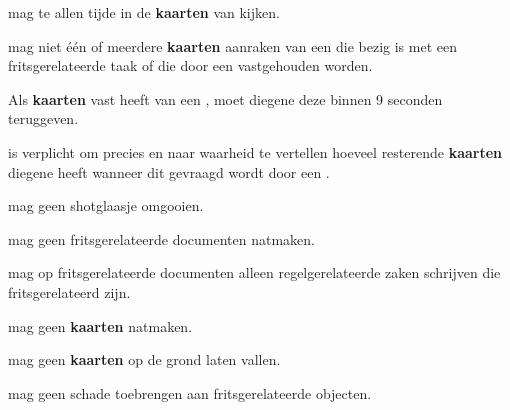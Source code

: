 
\vervolgLijst{}
\item \EenSpeler mag te allen tijde in de \textbf{kaarten} van \alleSpelers kijken.
\eindLijst{}

\vervolgLijst{}
\item \EenSpeler mag niet \'e\'en of meerdere \textbf{kaarten} aanraken van een \medeSpeler die bezig is met een fritsgerelateerde taak of die door een \medeSpeler vastgehouden worden.
\eindLijst{}

\vervolgLijst{}
\item Als \eenSpeler \textbf{kaarten} vast heeft van een \medeSpelerN, moet diegene deze binnen 9 seconden teruggeven.
\eindLijst{}

\vervolgLijst{}
\item \EenSpeler is verplicht om precies en naar waarheid te vertellen hoeveel resterende \textbf{kaarten} diegene heeft wanneer dit gevraagd wordt door een \medeSpelerN.
\eindLijst{}

\footnotetext[2]{\footnoteEenDubbeleFritsNemen}
\footnotetext[3]{\footnoteFritsjeDesNemen}

\newpage
{}
\label{hoofdstuk:algemeen_einde}



\vervolgLijst{}
\item \EenSpeler mag geen shotglaasje omgooien.
\eindLijst{}

\vervolgLijst{}
\item \EenSpeler mag geen fritsgerelateerde documenten natmaken.
\eindLijst{}

\vervolgLijst{}
\item \EenSpeler mag op fritsgerelateerde documenten alleen regelgerelateerde zaken schrijven die fritsgerelateerd zijn.
\eindLijst{}

\vervolgLijst{}
\item \EenSpeler mag geen \textbf{kaarten} natmaken.
\eindLijst{}

\vervolgLijst{}
\item \EenSpeler mag geen \textbf{kaarten} op de grond laten vallen.
\eindLijst{}

\vervolgLijst{}
\item \EenSpeler mag geen schade toebrengen aan fritsgerelateerde objecten.
\eindLijst{}


